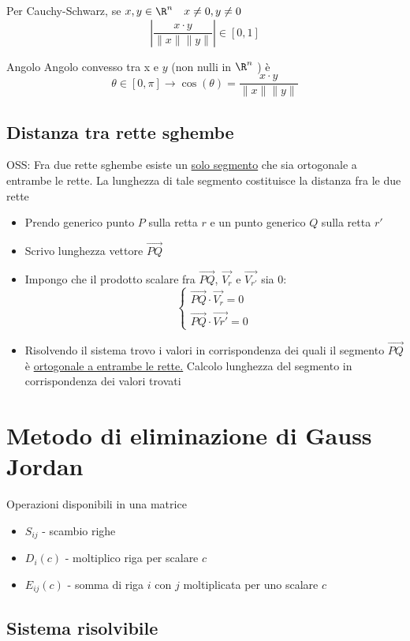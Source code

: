 Per Cauchy-Schwarz, se $ x, y  \in  \R ^{ n} \quad  x \neq 0 , y \neq 0$
\[
	\left|\frac{x \cdot y}{\|x\|\| y\|}\right|  \in  \left[ 0,1 \right]
\]
\begin{definizione}{Angolo}
	Angolo convesso tra x e $ y$ (non nulli in $\R ^{n}$ ) è \[
		\theta  \in  \left[ 0 , \pi \right] \rightarrow \cos\left( \theta  \right) = \frac{x \cdot y}{\|x\| \| y\|}
	\]
\end{definizione}

\subsection{Distanza tra rette sghembe}
OSS: Fra due rette sghembe esiste un \underline{solo segmento} che sia ortogonale a entrambe le rette. La lunghezza di tale segmento costituisce la distanza fra le due rette
\begin{itemize}
	\item Prendo generico punto $P$ sulla retta $r$ e un punto generico $Q$ sulla retta $r'$
	\item Scrivo lunghezza vettore $\vec{PQ}$
	\item Impongo che il prodotto scalare fra $\vec{PQ} $, $ \vec{V_r}$ e $\vec{V_{r'}}$ sia 0: \[
		      \begin{cases}
			      \vec{PQ} \cdot \vec{V_r} =0 \\
			      \vec{PQ} \cdot \vec{V{r'}} = 0
		      \end{cases}
	      \]
	\item Risolvendo il sistema trovo i valori in corrispondenza dei quali il segmento $\vec{PQ}$ è \underline{ortogonale a entrambe le rette.} Calcolo lunghezza del segmento in corrispondenza dei valori trovati
\end{itemize}

\section{Metodo di eliminazione di Gauss Jordan}
Operazioni disponibili in una matrice
\begin{itemize}
	\item $S_{ij}$ - scambio righe
	\item $D_i\left( c \right) $ - moltiplico riga per scalare $ c $
	\item $E_{ij}\left( c \right) $ - somma di riga $ i$ con $j$ moltiplicata per uno scalare $ c $
\end{itemize}
\subsection{Sistema risolvibile}

